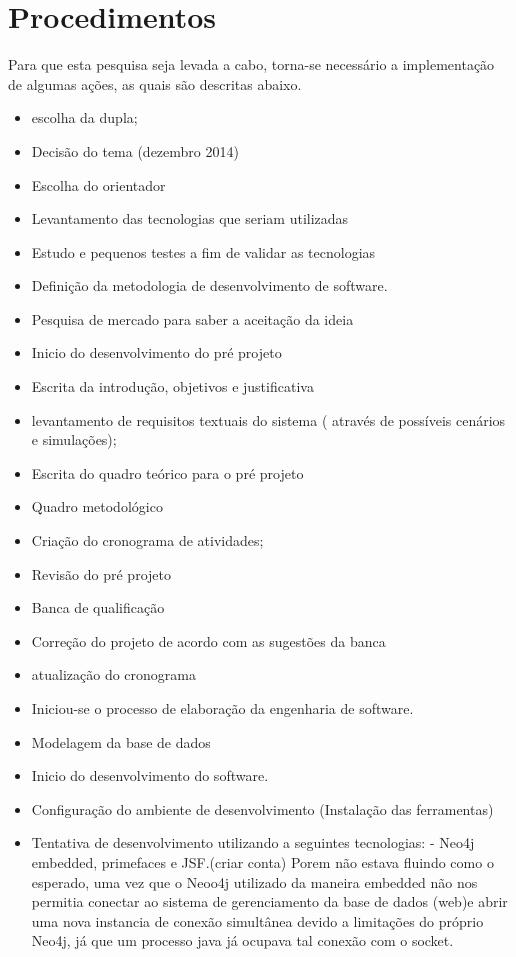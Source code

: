 \section{Procedimentos}

\par Para que esta pesquisa seja levada a cabo, torna-se necessário a implementação de algumas ações, as quais são descritas abaixo.

\begin{itemize}
	\item escolha da dupla;
	\item Decisão do tema (dezembro 2014)
	\item Escolha do orientador
	\item Levantamento das tecnologias que seriam utilizadas
	\item Estudo e pequenos testes a fim de validar as tecnologias
	\item Definição da metodologia de desenvolvimento de software.
	\item Pesquisa de mercado para saber a aceitação da ideia
	\item Inicio do desenvolvimento do pré projeto
	\item Escrita da introdução, objetivos e justificativa
	\item levantamento de requisitos textuais do sistema ( através de possíveis cenários e simulações);
	\item Escrita do quadro teórico para o pré projeto 
	\item Quadro metodológico
	\item Criação do cronograma de atividades;
	\item Revisão do pré projeto
	\item Banca de qualificação
	\item Correção do projeto de acordo com as sugestões da banca
	\item atualização do cronograma	
	\item Iniciou-se o processo de elaboração da engenharia de software.
	\item Modelagem da base de dados
	\item Inicio do desenvolvimento do software.	
	\item Configuração do ambiente de desenvolvimento (Instalação das ferramentas)
	\item Tentativa de desenvolvimento utilizando a seguintes tecnologias:
		- Neo4j embedded, primefaces e JSF.(criar conta) Porem não estava fluindo como o esperado, uma vez que o Neoo4j utilizado da maneira embedded não nos permitia conectar ao sistema de gerenciamento da base de dados (web)e abrir uma nova instancia de conexão simultânea devido a limitações do próprio Neo4j, já que um processo java já ocupava tal conexão com o socket.

\end{itemize}
